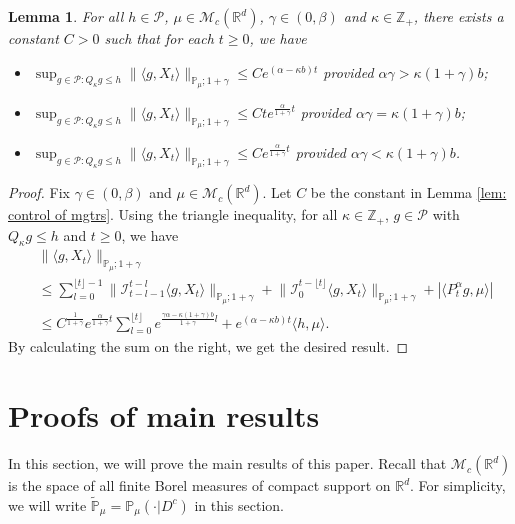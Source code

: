 \documentclass[12pt,a4paper]{amsart}
\theoremstyle{plain}
\newtheorem{lem}[thm]{Lemma}
\theoremstyle{definition}
\numberwithin{equation}{section}
\begin{document}
\begin{lem}
\label{lem: control moment}
    For all $h \in \mathcal P$, $\mu \in \mathcal M_c(\mathbb R^d)$, $\gamma\in (0, \beta)$ and $\kappa \in \mathbb Z_+$, there exists a constant $C > 0$ such that for each $t\geq 0$, we have
\begin{itemize}
\item[(1)]
    $\sup_{g\in \mathcal P: Q_\kappa g \leq h}\|\langle g,X_t\rangle\|_{\mathbb{P}_{\mu};1+\gamma}\leq C e^{(\alpha-\kappa b)t}$ provided $\alpha\gamma > \kappa (1+\gamma)b$;
\item[(2)]
    $\sup_{g\in \mathcal P: Q_\kappa g \leq h}\|\langle g,X_t\rangle\|_{\mathbb{P}_{\mu};1+\gamma}\leq C te^{\frac{\alpha}{1+\gamma}t}$ provided $\alpha\gamma = \kappa (1+\gamma)b$;
\item[(3)]
    $\sup_{g\in \mathcal P: Q_\kappa g \leq h} \|\langle g,X_t\rangle\|_{\mathbb{P}_{\mu};1+\gamma}\leq C e^{\frac{\alpha}{1+\gamma}t}$ provided $\alpha\gamma < \kappa (1+\gamma)b$.
\end{itemize}
\end{lem}
\begin{proof}
    Fix $\gamma \in (0,\beta)$ and $\mu \in \mathcal M_c(\mathbb R^d)$.
    Let $C$ be the constant in Lemma \ref{lem: control of mgtrs}.
    Using the triangle inequality, for all $\kappa\in \mathbb Z_+$, $g \in \mathcal P$ with $Q_\kappa g \leq h$ and $t\geq 0$, we have
\begin{align}
    &\|\langle g,X_t\rangle\|_{\mathbb P_\mu;1+\gamma}
        \\ &\leq \sum_{l=0}^{\lfloor t\rfloor - 1}\big\| \mathcal{I}_{t-l-1}^{t-l}\langle g,X_t\rangle \big\|_{\mathbb P_\mu;1+\gamma}+\big\| \mathcal{I}_{0}^{t-\lfloor t \rfloor}\langle g,X_t\rangle  \big\|_{\mathbb P_\mu;1+\gamma}
    + |\langle P^\alpha_t g,\mu\rangle|
    \\ &\leq C^{\frac{1}{1+\gamma}} e^{\frac{\alpha}{1+\gamma}t} \sum_{l=0}^{\lfloor t\rfloor} e^{\frac{\gamma\alpha-\kappa (1+\gamma)b}{1+\gamma} l} + e^{(\alpha - \kappa b)t} \langle h,\mu\rangle.
\end{align}
    By calculating the sum on the right, we get the desired result.
\end{proof}

\section{Proofs of main results}\label{proofs of main results}
    In this section, we will prove the main results of this paper. Recall that $\mathcal{M}_c(\mathbb{R}^d)$ is the space of all finite Borel measures of compact support on $\mathbb{R}^d$.
    For simplicity, we will write $\mathbb{\widetilde{P}}_{\mu}=\mathbb{P}_{\mu}(\cdot|D^c)$ in this section.
\end{document}
